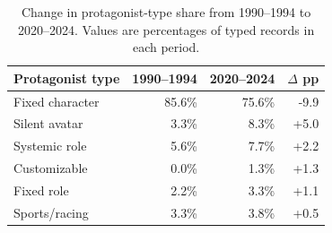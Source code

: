 \begin{table}[t]
\centering
\caption{Change in protagonist-type share from 1990--1994 to 2020--2024. Values are percentages of typed records in each period.}
\label{tab:protagonist_type_change}
\small
\setlength{\tabcolsep}{5pt}
\begin{tabular}{lrrr}
\toprule
\textbf{Protagonist type} & \textbf{1990--1994} & \textbf{2020--2024} & \textbf{$\Delta$ pp} \\
\midrule
Fixed character & 85.6\% & 75.6\% & -9.9 \\
Silent avatar & 3.3\% & 8.3\% & +5.0 \\
Systemic role & 5.6\% & 7.7\% & +2.2 \\
Customizable & 0.0\% & 1.3\% & +1.3 \\
Fixed role & 2.2\% & 3.3\% & +1.1 \\
Sports/racing & 3.3\% & 3.8\% & +0.5 \\
\bottomrule
\end{tabular}
\end{table}
